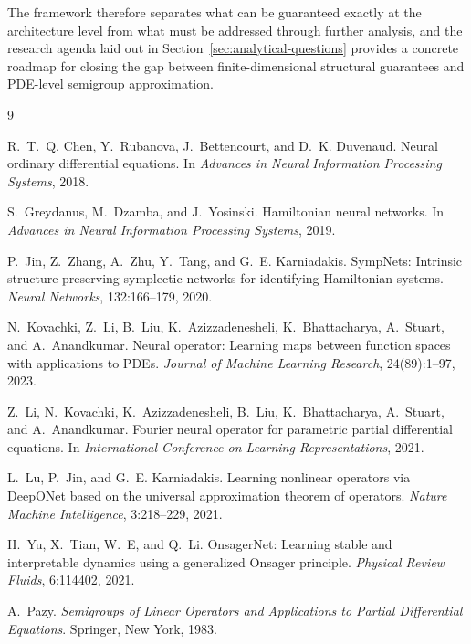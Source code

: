 \documentclass[11pt]{article}
\begin{document}
The framework therefore separates what can be guaranteed exactly at the architecture level from what must be addressed through further analysis, and the research agenda laid out in Section~\ref{sec:analytical-questions} provides a concrete roadmap for closing the gap between finite-dimensional structural guarantees and PDE-level semigroup approximation.

\begin{thebibliography}{9}

R.~T.~Q. Chen, Y.~Rubanova, J.~Bettencourt, and D.~K. Duvenaud.
Neural ordinary differential equations.
In \emph{Advances in Neural Information Processing Systems}, 2018.

S.~Greydanus, M.~Dzamba, and J.~Yosinski.
Hamiltonian neural networks.
In \emph{Advances in Neural Information Processing Systems}, 2019.

P.~Jin, Z.~Zhang, A.~Zhu, Y.~Tang, and G.~E. Karniadakis.
SympNets: Intrinsic structure-preserving symplectic networks for identifying Hamiltonian systems.
\emph{Neural Networks}, 132:166--179, 2020.

N.~Kovachki, Z.~Li, B.~Liu, K.~Azizzadenesheli, K.~Bhattacharya, A.~Stuart, and A.~Anandkumar.
Neural operator: Learning maps between function spaces with applications to PDEs.
\emph{Journal of Machine Learning Research}, 24(89):1--97, 2023.

Z.~Li, N.~Kovachki, K.~Azizzadenesheli, B.~Liu, K.~Bhattacharya, A.~Stuart, and A.~Anandkumar.
Fourier neural operator for parametric partial differential equations.
In \emph{International Conference on Learning Representations}, 2021.

L.~Lu, P.~Jin, and G.~E. Karniadakis.
Learning nonlinear operators via DeepONet based on the universal approximation theorem of operators.
\emph{Nature Machine Intelligence}, 3:218--229, 2021.

H.~Yu, X.~Tian, W.~E, and Q.~Li.
OnsagerNet: Learning stable and interpretable dynamics using a generalized Onsager principle.
\emph{Physical Review Fluids}, 6:114402, 2021.

A.~Pazy.
\emph{Semigroups of Linear Operators and Applications to Partial Differential Equations}.
Springer, New York, 1983.


\end{thebibliography}
\end{document}
